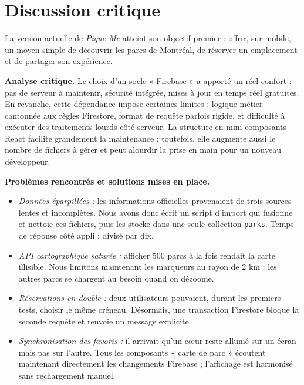 \documentclass[12pt,a4paper]{article}
\begin{document}
\clearpage
\section{Discussion critique}

La version actuelle de \textit{Pique-Me} atteint son objectif premier :
offrir, sur mobile, un moyen simple de découvrir les parcs de Montréal,
de réserver un emplacement et de partager son expérience. 

\medskip\noindent
\textbf{Analyse critique.}  
Le choix d'un socle « Firebase » a apporté un réel confort : pas de
serveur à maintenir, sécurité intégrée, mises à jour en temps réel
gratuites. En revanche, cette dépendance impose certaines limites :
logique métier cantonnée aux règles Firestore, format de requête parfois
rigide, et difficulté à exécuter des traitements lourds côté serveur. La structure en mini-composants
React facilite grandement la maintenance ; toutefois, elle augmente
aussi le nombre de fichiers à gérer et peut alourdir la prise en main
pour un nouveau développeur.

\medskip\noindent
\textbf{Problèmes rencontrés et solutions mises en place.}
\begin{itemize}
  \item \emph{Données éparpillées :} les informations officielles
        provenaient de trois sources lentes et incomplètes. Nous avons
        donc écrit un script d'import qui fusionne et nettoie ces
        fichiers, puis les stocke dans une seule collection
        \texttt{parks}. Temps de réponse côté appli : divisé par dix.
  \item \emph{API cartographique saturée :} afficher 500 parcs à la fois
        rendait la carte illisible. Nous limitons maintenant les
        marqueurs au rayon de 2 km ; les autres parcs se chargent au
        besoin quand on dézoome.
  \item \emph{Réservations en double :} deux utilisateurs pouvaient,
        durant les premiers tests, choisir le même créneau. Désormais,
        une transaction Firestore bloque la seconde requête et renvoie
        un message explicite.
  \item \emph{Synchronisation des favoris :} il arrivait qu'un cœur
        reste allumé sur un écran mais pas sur l'autre. Tous les
        composants « carte de parc » écoutent maintenant directement
        les changements Firebase ; l'affichage est harmonisé sans
        rechargement manuel.
\end{itemize}
\end{document}
